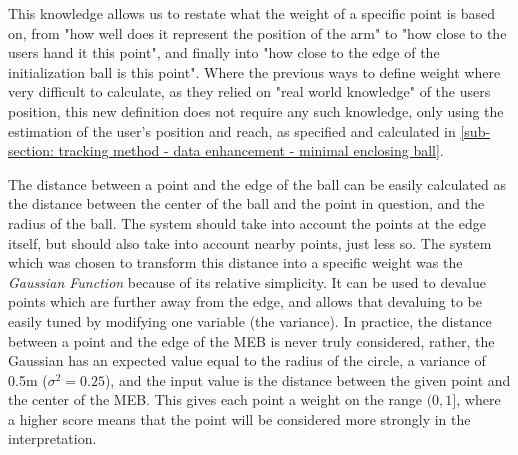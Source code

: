This knowledge allows us to restate what the weight of a specific point is based on, from "how well does it represent the position of the arm" to "how close to the users hand it this point", and finally into "how close to the edge of the initialization ball is this point".
Where the previous ways to define weight where very difficult to calculate, as they relied on "real world knowledge" of the users position, this new definition does not require any such knowledge, only using the estimation of the user's position and reach, as specified and calculated in \cref{sub-section: tracking method - data enhancement - minimal enclosing ball}.

The distance between a point and the edge of the ball can be easily calculated as the distance between the center of the ball and the point in question, and the radius of the ball.
The system should take into account the points at the edge itself, but should also take into account nearby points, just less so.
The system which was chosen to transform this distance into a specific weight was the \textit{Gaussian Function} because of its relative simplicity.
It can be used to devalue points which are further away from the edge, and allows that devaluing to be easily tuned by modifying one variable (the variance).
In practice, the distance between a point and the edge of the MEB is never truly considered, rather, the Gaussian has an expected value equal to the radius of the circle, a variance of 0.5m ($\sigma^2 = 0.25$), and the input value is the distance between the given point and the center of the MEB.
This gives each point a weight on the range $(0, 1]$, where a higher score means that the point will be considered more strongly in the interpretation.








